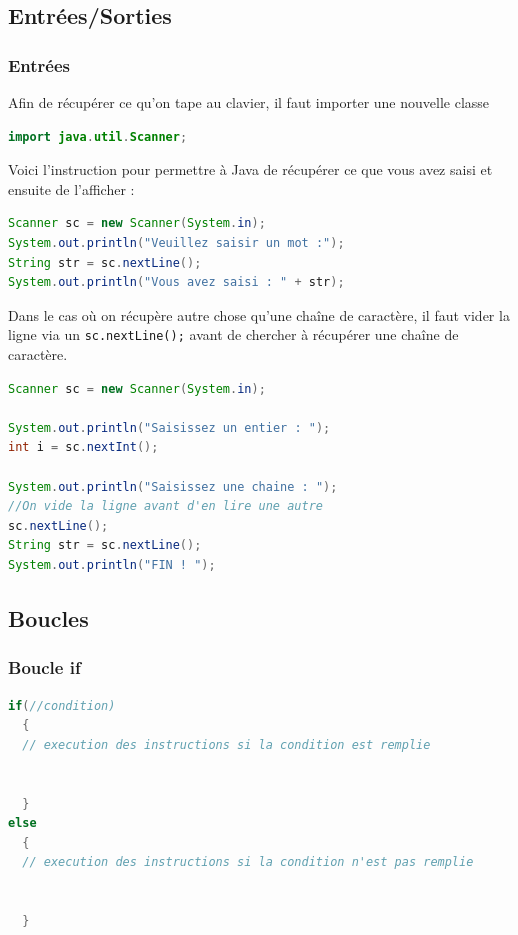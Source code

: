 \documentclass[a4paper,twoside]{article}
\begin{document}
\subsection{Entrées/Sorties}
\subsubsection{Entrées}
Afin de récupérer ce qu'on tape au clavier, il faut importer une nouvelle classe
\begin{lstlisting}[language=java]
import java.util.Scanner;
\end{lstlisting}

\bigskip

Voici l'instruction pour permettre à Java de récupérer ce que vous avez saisi et ensuite de l'afficher :
\begin{lstlisting}[language=java]
Scanner sc = new Scanner(System.in);
System.out.println("Veuillez saisir un mot :");
String str = sc.nextLine();
System.out.println("Vous avez saisi : " + str);
\end{lstlisting}

\bigskip

Dans le cas où on récupère autre chose qu'une chaîne de caractère, il faut vider la ligne via un \texttt{sc.nextLine();} avant de chercher à récupérer une chaîne de caractère.
\begin{lstlisting}[language=java]
Scanner sc = new Scanner(System.in);

System.out.println("Saisissez un entier : ");
int i = sc.nextInt();

System.out.println("Saisissez une chaine : ");
//On vide la ligne avant d'en lire une autre
sc.nextLine();
String str = sc.nextLine();
System.out.println("FIN ! ");
\end{lstlisting}



\subsection{Boucles}
\subsubsection{Boucle if}
\begin{lstlisting}[language=java]
if(//condition)
  {
  // execution des instructions si la condition est remplie
  
  
  }
else
  {
  // execution des instructions si la condition n'est pas remplie
  
  
  }
\end{lstlisting}
\end{document}
